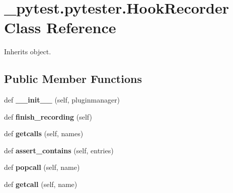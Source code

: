 \hypertarget{class__pytest_1_1pytester_1_1_hook_recorder}{}\section{\+\_\+pytest.\+pytester.\+Hook\+Recorder Class Reference}
\label{class__pytest_1_1pytester_1_1_hook_recorder}


Inherits object.

\subsection*{Public Member Functions}
\begin{DoxyCompactItemize}
\item 
\mbox{\label{class__pytest_1_1pytester_1_1_hook_recorder_a62538aa2dec55443a6fa5e6087beabee}} 
def {\bfseries \+\_\+\+\_\+init\+\_\+\+\_\+} (self, pluginmanager)
\item 
\mbox{\label{class__pytest_1_1pytester_1_1_hook_recorder_ab4bb292bc68f8ab083214e668a0ab59f}} 
def {\bfseries finish\+\_\+recording} (self)
\item 
\mbox{\label{class__pytest_1_1pytester_1_1_hook_recorder_a0bddc80a82bcacdc87a44919ac088989}} 
def {\bfseries getcalls} (self, names)
\item 
\mbox{\label{class__pytest_1_1pytester_1_1_hook_recorder_af3bd788bf6cc845db6228bd4902d3eed}} 
def {\bfseries assert\+\_\+contains} (self, entries)
\item 
\mbox{\label{class__pytest_1_1pytester_1_1_hook_recorder_a4f606db051997363036eb89e276ab588}} 
def {\bfseries popcall} (self, name)
\item 
\mbox{\label{class__pytest_1_1pytester_1_1_hook_recorder_a1be41dcdfa6d4a1564545b23a0af9074}} 
def {\bfseries getcall} (self, name)
\item 
\mbox{\label{class__pytest_1_1pytester_1_1_hook_recorder_ad0b08fea43f01459ad3c56ba5f6445c7}} 

\end{DoxyCompactItemize}
